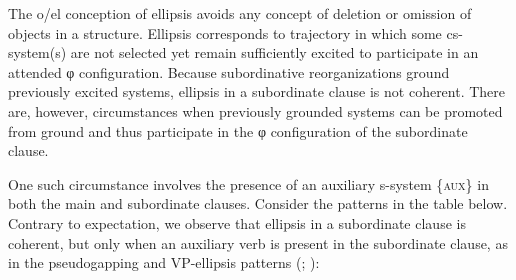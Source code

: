   The o/el conception of ellipsis avoids any concept of deletion or omission of objects in a structure. Ellipsis corresponds to trajectory in which some cs-system(s) are not selected yet remain sufficiently excited to participate in an attended φ configuration. Because subordinative reorganizations ground previously excited systems, ellipsis in a subordinate clause is not coherent. There are, however, circumstances when previously grounded systems can be promoted from ground and thus participate in the φ configuration of the subordinate clause. 

  One such circumstance involves the presence of an auxiliary s-system \{\textsc{aux}\} in both the main and subordinate clauses. Consider the patterns in the table below. Contrary to expectation, we observe that ellipsis in a subordinate clause is coherent, but only when an auxiliary verb is present in the subordinate clause, as in the pseudogapping and VP-ellipsis patterns (\citealt{Johnson20012009}; \citealt{Merchant2001}):

